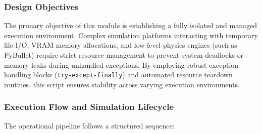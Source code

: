 \documentclass{article}
\begin{document}
\subsubsection{Design Objectives}
The primary objective of this module is establishing a fully isolated and managed execution environment. Complex simulation platforms interacting with temporary file I/O, VRAM memory allocations, and low-level physics engines (such as PyBullet) require strict resource management to prevent system deadlocks or memory leaks during unhandled exceptions. By employing robust exception handling blocks (\texttt{try-except-finally}) and automated resource teardown routines, this script ensures stability across varying execution environments.

\subsubsection{Execution Flow and Simulation Lifecycle}
The operational pipeline follows a structured sequence:
\end{document}
